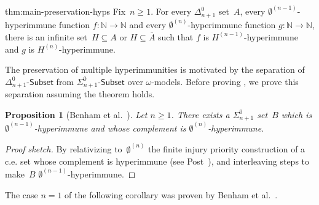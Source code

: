 \documentclass{article}
\def\NN{\mathbb{N}}
\newcommand{\Sub}[1]{{#1}\mbox{-}\mathsf{Subset}}
\numberwithin{theorem}{section}
\newtheorem{proposition}[theorem]{Proposition}
\theoremstyle{definition}
\begin{document}
\begin{repmaintheorem}{thm:main-preservation-hyps}
Fix~$n \geq 1$. For every $\Delta^0_{n+1}$ set~$A$, every $\emptyset^{(n-1)}$-hyperimmune function $f : \NN \to \NN$ and every $\emptyset^{(n)}$-hyperimmune function $g : \NN \to \NN$, there is an infinite set~$H \subseteq A$ or $H \subseteq \overline{A}$ such that $f$ is $H^{(n-1)}$-hyperimmune and $g$ is $H^{(n)}$-hyperimmune.
\end{repmaintheorem}

The preservation of multiple hyperimmunities is motivated by the separation of $\Sub{\Delta^0_{n+1}}$ from $\Sub{\Sigma^0_{n+1}}$ over $\omega$-models.
Before proving , we prove this separation assuming the theorem holds. 

\begin{proposition}[Benham et al.~\cite{benham2024ginsburg}]\label{prop:sigman-hyp-deltan-hyp}
Let $n \geq 1$. There exists a $\Sigma^0_{n+1}$ set~$B$ which is $\emptyset^{(n-1)}$-hyperimmune and whose complement is $\emptyset^{(n)}$-hyperimmune.
\end{proposition}

\begin{proof}[Proof sketch]
By relativizing to~$\emptyset^{(n)}$ the finite injury priority construction of a c.e. set whose complement is hyperimmune (see Post~\cite[Section 5]{post1944recursively}), and interleaving steps to make~$B$ $\emptyset^{(n-1)}$-hyperimmune.
\end{proof}

The case $n = 1$ of the following corollary was proven by Benham et al.~\cite{benham2024ginsburg}.
\end{document}
